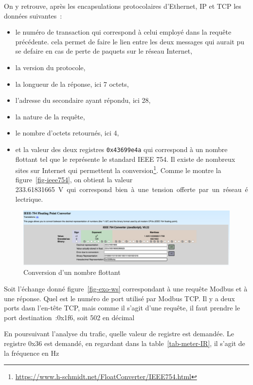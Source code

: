 On y retrouve, après les encapsulations protocolaires d'Ethernet, IP et TCP les données suivantes~:
\begin{itemize}
    \item le numéro de transaction qui correspond à celui employé dans la requête précédente. cela permet de faire le lien entre les deux messages qui aurait pu se defaire en cas de perte de paquets sur le réseau Internet,
    \item la version du protocole,
    \item la longueur de la réponse, ici 7 octets,
    \item l'adresse du secondaire ayant répondu, ici 28,
    \item la nature de la requête,
    \item le nombre d'octets retournés, ici 4,
    \item et la valeur des deux registres \texttt{0x43699e4a} qui correspond à un nombre flottant tel que le représente le standard IEEE 754. Il existe de nombreux sites sur Internet qui permettent la conversion\footnote{\url{https://www.h-schmidt.net/FloatConverter/IEEE754.html}}. Comme le montre la figure~\vref{fig-ieee754}, on obtient la valeur \SI{233.61831665}\volt qui correspond bien à une tension offerte par un réseau électrique.
\end{itemize}

  \begin{figure}[tbp]
\centerline{\includegraphics[width=1\columnwidth]{Pictures/IEEE754.png}}
\caption{Conversion d'un nombre flottant}
\label{fig-ieee754}
\end{figure}

{Soit l'échange donné figure~\vref{fig-exo-ws} correspondant à une requête Modbus et à une réponse.
Quel est le numéro de port utilisé par Modbus TCP.}
{Il y a deux ports dasn l'en-tête TCP, mais comme il s'agit d'une requête, il faut prendre le port destination~:0x1f6, soit 502 en décimal}

{En poursuivant l'analyse du trafic, quelle valeur de registre est demandée.}
{Le registre 0x36 est demandé, en regardant dans la table~\vref{tab-meter-IR}, il s'agit de la fréquence en Hz}

